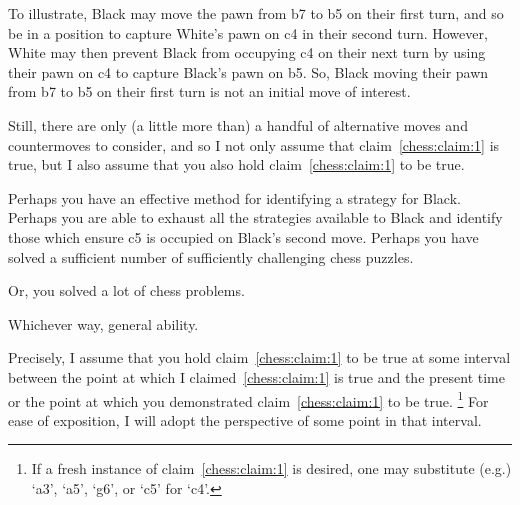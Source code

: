 \documentclass[10pt]{article}
\begin{document}
To illustrate, Black may move the pawn from b7 to b5 on their first turn, and so be in a position to capture White's pawn on c4 in their second turn.
However, White may then prevent Black from occupying c4 on their next turn by using their pawn on c4 to capture Black's pawn on b5.
So, Black moving their pawn from b7 to b5 on their first turn is not an initial move of interest.

Still, there are only (a little more than) a handful of alternative moves and countermoves to consider, and so I not only assume that claim~\ref{chess:claim:1} is true, but I also assume that you also hold claim~\ref{chess:claim:1} to be true.

\begin{note}
  Perhaps you have an effective method for identifying a strategy for Black.
  Perhaps you are able to exhaust all the strategies available to Black and identify those which ensure c5 is occupied on Black's second move.
  Perhaps you have solved a sufficient number of sufficiently challenging chess puzzles.

  Or, you solved a lot of chess problems.

  Whichever way, general ability.
\end{note}

Precisely, I assume that you hold claim~\ref{chess:claim:1} to be true at some interval between the point at which I claimed~\ref{chess:claim:1} is true and the present time or the point at which you demonstrated claim~\ref{chess:claim:1} to be true.\nolinebreak
\footnote{
  If a fresh instance of claim~\ref{chess:claim:1} is desired, one may substitute (e.g.) `a3', `a5', `g6', or `c5' for `c4'.
}
For ease of exposition, I will adopt the perspective of some point in that interval.
\end{document}
